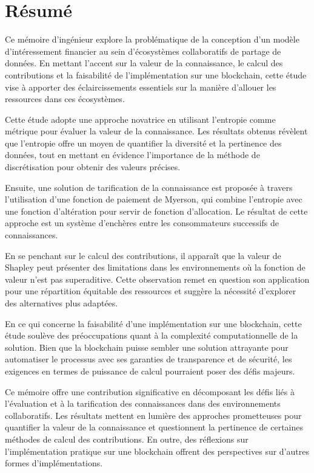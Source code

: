 \chapter*{Résumé}
\thispagestyle{plain}

Ce mémoire d'ingénieur explore la problématique de la conception d'un modèle d'intéressement financier au sein d'écosystèmes collaboratifs de partage de données. En mettant l'accent sur la valeur de la connaissance, le calcul des contributions et la faisabilité de l'implémentation sur une blockchain, cette étude vise à apporter des éclaircissements essentiels sur la manière d'allouer les ressources dans ces écosystèmes.

Cette étude adopte une approche novatrice en utilisant l'entropie comme métrique pour évaluer la valeur de la connaissance. Les résultats obtenus révèlent que l'entropie offre un moyen de quantifier la diversité et la pertinence des données, tout en mettant en évidence l'importance de la méthode de discrétisation pour obtenir des valeurs précises.

Ensuite, une solution de tarification de la connaissance est proposée à travers l'utilisation d'une fonction de paiement de Myerson, qui combine l'entropie avec une fonction d'altération pour servir de fonction d'allocation. Le résultat de cette approche est un système d'enchères entre les consommateurs successifs de connaissances.

En se penchant sur le calcul des contributions, il apparaît que la valeur de Shapley peut présenter des limitations dans les environnements où la fonction de valeur n'est pas superaditive. Cette observation remet en question son application pour une répartition équitable des ressources et suggère la nécessité d'explorer des alternatives plus adaptées.

En ce qui concerne la faisabilité d'une implémentation sur une blockchain, cette étude soulève des préoccupations quant à la complexité computationnelle de la solution. Bien que la blockchain puisse sembler une solution attrayante pour automatiser le processus avec ses garanties de transparence et de sécurité, les exigences en termes de puissance de calcul pourraient poser des défis majeurs.

Ce mémoire offre une contribution significative en décomposant les défis liés à l'évaluation et à la tarification des connaissances dans des environnements collaboratifs. Les résultats mettent en lumière des approches prometteuses pour quantifier la valeur de la connaissance et questionnent la pertinence de certaines méthodes de calcul des contributions. En outre, des réflexions sur l'implémentation pratique sur une blockchain offrent des perspectives sur d'autres formes d'implémentations.

